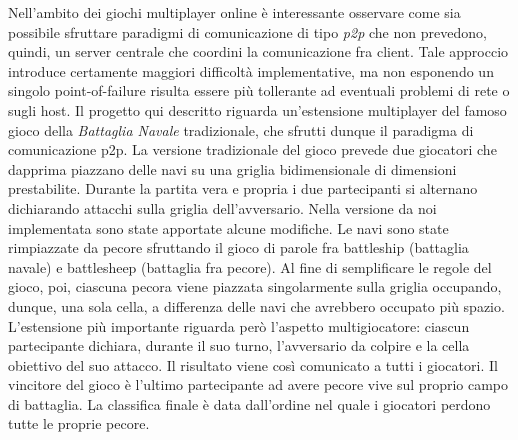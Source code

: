 Nell'ambito dei giochi multiplayer online è interessante osservare come sia 
possibile sfruttare paradigmi di comunicazione di tipo \textit{p2p} che non
prevedono, quindi, un server centrale che coordini la comunicazione fra client.
Tale approccio introduce certamente maggiori difficoltà implementative, ma
non esponendo un singolo point-of-failure risulta essere più tollerante ad
eventuali problemi di rete o sugli host.\newline
Il progetto qui descritto riguarda un'estensione multiplayer del famoso gioco
della \textit{Battaglia Navale} tradizionale, che sfrutti dunque il paradigma di
comunicazione p2p.\newline
La versione tradizionale del gioco prevede due giocatori che dapprima piazzano 
delle navi su una griglia bidimensionale di dimensioni prestabilite. Durante la 
partita vera e propria i due partecipanti si alternano dichiarando 
attacchi sulla griglia dell'avversario.\newline
Nella versione da noi implementata sono state apportate alcune modifiche.
Le navi sono state rimpiazzate da pecore sfruttando il 
gioco di parole fra battleship (battaglia navale) e battlesheep (battaglia fra
pecore). Al fine di semplificare le regole del gioco, poi, ciascuna pecora viene
piazzata singolarmente sulla griglia occupando, dunque, una sola cella, a
differenza delle navi che avrebbero occupato più spazio.\newline
L'estensione più importante riguarda però l'aspetto multigiocatore: ciascun 
partecipante dichiara, durante il suo turno, l'avversario da colpire e la 
cella obiettivo del suo attacco. Il risultato viene così comunicato a tutti i 
giocatori. Il vincitore del gioco è l'ultimo partecipante ad avere pecore vive 
sul proprio campo di battaglia. La classifica finale è data dall'ordine nel 
quale i giocatori perdono tutte le proprie pecore.
